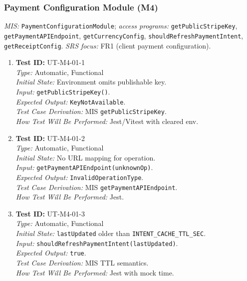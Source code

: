 \documentclass[12pt, titlepage]{article}
\begin{document}
\subsubsection{Payment Configuration Module (M4)}

\textit{MIS:} \texttt{PaymentConfigurationModule}; \textit{access programs:} \texttt{getPublicStripeKey}, \texttt{getPaymentAPIEndpoint}, \texttt{getCurrencyConfig}, \texttt{shouldRefreshPaymentIntent}, \texttt{getReceiptConfig}. \textit{SRS focus:} FR1 (client payment configuration).

\begin{enumerate}\setlength{\itemsep}{0.85em}
    \item \textbf{Test ID:} UT-M4-01-1\\[0.25em]
    \textit{Type:} Automatic, Functional\\
    \textit{Initial State:} Environment omits publishable key.\\
    \textit{Input:} \texttt{getPublicStripeKey()}.\\
    \textit{Expected Output:} \texttt{KeyNotAvailable}.\\
    \textit{Test Case Derivation:} MIS \texttt{getPublicStripeKey}.\\
    \textit{How Test Will Be Performed:} Jest/Vitest with cleared env.

    \item \textbf{Test ID:} UT-M4-01-2\\[0.25em]
    \textit{Type:} Automatic, Functional\\
    \textit{Initial State:} No URL mapping for operation.\\
    \textit{Input:} \texttt{getPaymentAPIEndpoint(unknownOp)}.\\
    \textit{Expected Output:} \texttt{InvalidOperationType}.\\
    \textit{Test Case Derivation:} MIS \texttt{getPaymentAPIEndpoint}.\\
    \textit{How Test Will Be Performed:} Jest.

    \item \textbf{Test ID:} UT-M4-01-3\\[0.25em]
    \textit{Type:} Automatic, Functional\\
    \textit{Initial State:} \texttt{lastUpdated} older than \texttt{INTENT\_CACHE\_TTL\_SEC}.\\
    \textit{Input:} \texttt{shouldRefreshPaymentIntent(lastUpdated)}.\\
    \textit{Expected Output:} \texttt{true}.\\
    \textit{Test Case Derivation:} MIS TTL semantics.\\
    \textit{How Test Will Be Performed:} Jest with mock time.
\end{enumerate}
\end{document}
